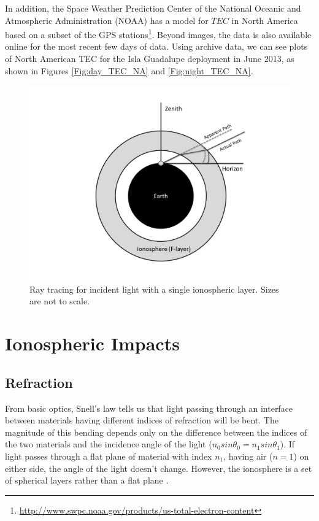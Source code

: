 In addition, the Space Weather Prediction Center of the National Oceanic and Atmospheric Administration (NOAA) has a model for $TEC$ in North America based on a subset of the GPS stations\footnote{\url{http://www.swpc.noaa.gov/products/us-total-electron-content}}. Beyond images, the data is also available online for the most recent few days of data. Using archive data, we can see plots of North American TEC for the Isla Guadalupe deployment in June 2013, as shown in Figures \ref{Fig:day_TEC_NA} and \ref{Fig:night_TEC_NA}. 


\begin{figure}[htb]
\begin{center}
\includegraphics[width=0.95\linewidth]{Ionosphere/figures/refraction.png}
\caption{Ray tracing for incident light with a single ionospheric layer. Sizes are not to scale. }
\label{Fig:iono_refrac}
\end{center}
\end{figure}

\section{Ionospheric Impacts}

\subsection{Refraction}
From basic optics, Snell's law tells us that light passing through an interface between materials having different indices of refraction will be bent. The magnitude of this bending depends only on the difference between the indices of the two materials and the incidence angle of the light ($n_0 sin \theta_0 = n_1 sin \theta_1$). If light passes through a flat plane of material with index $n_1$, having air ($n=1$) on either side, the angle of the light doesn't change. However, the ionosphere is a set of spherical layers rather than a flat plane \cite{thompson_2001}. 

